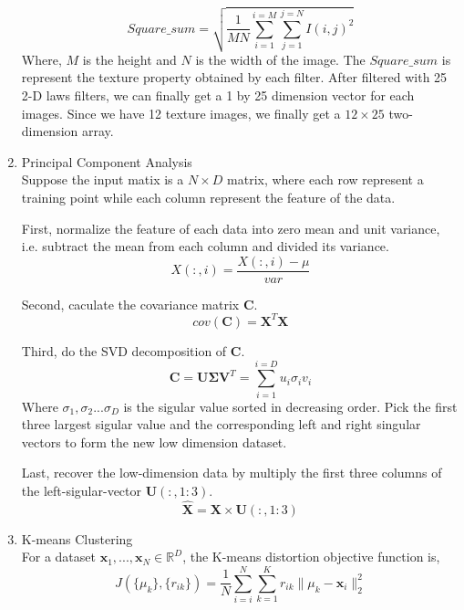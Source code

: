 \documentclass[11pt]{article}
\newcommand{\vct}[1]{\bm{#1}}
\newcommand{\mtx}[1]{\bm{#1}}
\begin{document}
\begin{enumerate}
\begin{equation}
Square\_ sum=\sqrt { \frac { 1 }{ MN } \sum _{ i=1 }^{ i=M }{ \sum _{ j=1 }^{ j=N }{ { I(i,j) }^{ 2 } }  }  } 
\end{equation}
Where, $M$ is the height and $N$ is the width of the image. The $Square\_ sum$ is represent the texture property obtained by each filter. After filtered with 25 2-D laws filters, we can finally get a 1 by 25 dimension vector for each images. Since we have 12 texture images, we finally get a $12 \times 25$ two-dimension array.\par
\item Principal Component Analysis \\
Suppose the input matix is a $N \times D$ matrix, where each row represent a training point while each column represent the feature of the data.\par
First, normalize the feature of each data into zero mean and unit variance, i.e. subtract the mean from each column and divided its variance. 
\begin{equation}
X(:,i)=\frac { X(:,i)-\mu  }{ var } 
\end{equation}
\par
Second, caculate the covariance matrix ${\mtx C}$.
\begin{equation}
cov(\mtx C)=\mtx X^{ T }\mtx X
\end{equation}
\par
Third, do the SVD decomposition of ${\mtx C}$.
\begin{equation}
\mtx C=\mtx U \mtx \Sigma \mtx V^{ T } = \sum _{ i=1 }^{ i=D }{ u_{i}\sigma_{i}v_{i} } 
\end{equation}
Where $\sigma_{1}, \sigma_{2} ... \sigma_{D}$ is the sigular value sorted in decreasing order. Pick the first three largest sigular value and the corresponding left and right singular vectors to form the new low dimension dataset.
\par
Last, recover the low-dimension data by multiply the first three columns of the left-sigular-vector ${\mtx U(:,1:3)}$.
\begin{equation}
\hat { \mtx X } =\mtx X\times \mtx U(:,1:3)
\end{equation}

\item K-means Clustering\\
For a dataset ${\vct x_1,...,\vct x_N} \in \mathbb{R}^D $, the K-means distortion objective function is, 
\begin{equation}
J(\{ \mu _{ k }\} ,\{ r_{ ik }\} )=\frac { 1 }{ N } \sum _{ i=i }^{ N }{ \sum _{ k=1 }^{ K }{ r_{ ik }\parallel { \mu  }_{ k }-{\vct x }_{ i }\parallel_{2} ^{ 2 } }  } 
\end{equation}


\end{enumerate}
\end{document}
